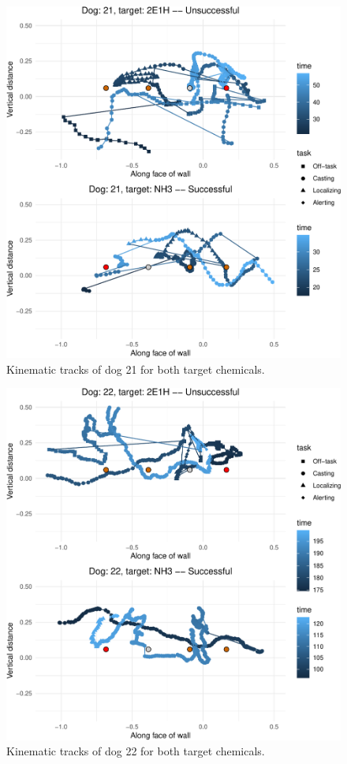 \documentclass[
]{article}
\begin{document}
\begin{figure}
\centering
\includegraphics{supplementary-info_files/figure-latex/dog-21-1.pdf}
\caption{\label{fig:dog-21}Kinematic tracks of dog 21 for both target chemicals.}
\end{figure}

\begin{figure}
\centering
\includegraphics{supplementary-info_files/figure-latex/dog-22-1.pdf}
\caption{\label{fig:dog-22}Kinematic tracks of dog 22 for both target chemicals.}
\end{figure}
\end{document}
